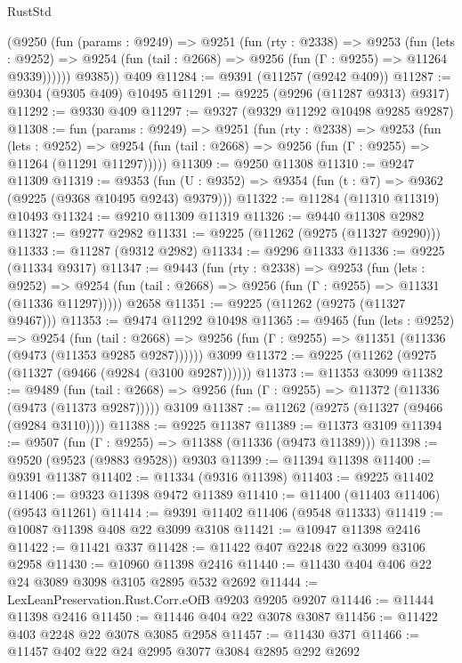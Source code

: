 \begin{lexlean}{RustStd}
\begin{coremodule}
        (@9250
          (fun (params : @9249) =>
          @9251
            (fun (rty : @2338) =>
            @9253
              (fun (lets : @9252) =>
              @9254 (fun (tail : @2668) => @9256 (fun (Γ : @9255) => @11264 @9339))))))
        @9385))
    @409
@11284 := @9391 (@11257 (@9242 @409))
@11287 := @9304 (@9305 @409) @10495
@11291 := @9225 (@9296 (@11287 @9313) @9317)
@11292 := @9330 @409
@11297 := @9327 (@9329 @11292 @10498 @9285 @9287)
@11308 := fun (params : @9249) =>
  @9251
    (fun (rty : @2338) =>
    @9253
      (fun (lets : @9252) =>
      @9254 (fun (tail : @2668) => @9256 (fun (Γ : @9255) => @11264 (@11291 @11297)))))
@11309 := @9250 @11308
@11310 := @9247 @11309
@11319 := @9353
    (fun (U : @9352) => @9354 (fun (t : @7) => @9362 (@9225 (@9368 @10495 @9243) @9379)))
@11322 := @11284 (@11310 @11319) @10493
@11324 := @9210 @11309 @11319
@11326 := @9440 @11308 @2982
@11327 := @9277 @2982
@11331 := @9225 (@11262 (@9275 (@11327 @9290)))
@11333 := @11287 (@9312 @2982)
@11334 := @9296 @11333
@11336 := @9225 (@11334 @9317)
@11347 := @9443
    (fun (rty : @2338) =>
    @9253
      (fun (lets : @9252) =>
      @9254 (fun (tail : @2668) => @9256 (fun (Γ : @9255) => @11331 (@11336 @11297)))))
    @2658
@11351 := @9225 (@11262 (@9275 (@11327 @9467)))
@11353 := @9474 @11292 @10498
@11365 := @9465
    (fun (lets : @9252) =>
    @9254
      (fun (tail : @2668) =>
      @9256 (fun (Γ : @9255) => @11351 (@11336 (@9473 (@11353 @9285 @9287))))))
    @3099
@11372 := @9225 (@11262 (@9275 (@11327 (@9466 (@9284 (@3100 @9287))))))
@11373 := @11353 @3099
@11382 := @9489
    (fun (tail : @2668) => @9256 (fun (Γ : @9255) => @11372 (@11336 (@9473 (@11373 @9287)))))
    @3109
@11387 := @11262 (@9275 (@11327 (@9466 (@9284 @3110))))
@11388 := @9225 @11387
@11389 := @11373 @3109
@11394 := @9507 (fun (Γ : @9255) => @11388 (@11336 (@9473 @11389)))
@11398 := @9520 (@9523 (@9883 @9528)) @9303
@11399 := @11394 @11398
@11400 := @9391 @11387
@11402 := @11334 (@9316 @11398)
@11403 := @9225 @11402
@11406 := @9323 @11398 @9472 @11389
@11410 := @11400 (@11403 @11406) (@9543 @11261)
@11414 := @9391 @11402 @11406 (@9548 @11333)
@11419 := @10087 @11398 @408 @22 @3099 @3108
@11421 := @10947 @11398 @2416
@11422 := @11421 @337
@11428 := @11422 @407 @2248 @22 @3099 @3106 @2958
@11430 := @10960 @11398 @2416
@11440 := @11430 @404 @406 @22 @24 @3089 @3098 @3105 @2895 @532 @2692
@11444 := LexLeanPreservation.Rust.Corr.eOfB @9203 @9205 @9207
@11446 := @11444 @11398 @2416
@11450 := @11446 @404 @22 @3078 @3087
@11456 := @11422 @403 @2248 @22 @3078 @3085 @2958
@11457 := @11430 @371
@11466 := @11457 @402 @22 @24 @2995 @3077 @3084 @2895 @292 @2692

\end{coremodule}
\end{lexlean}
